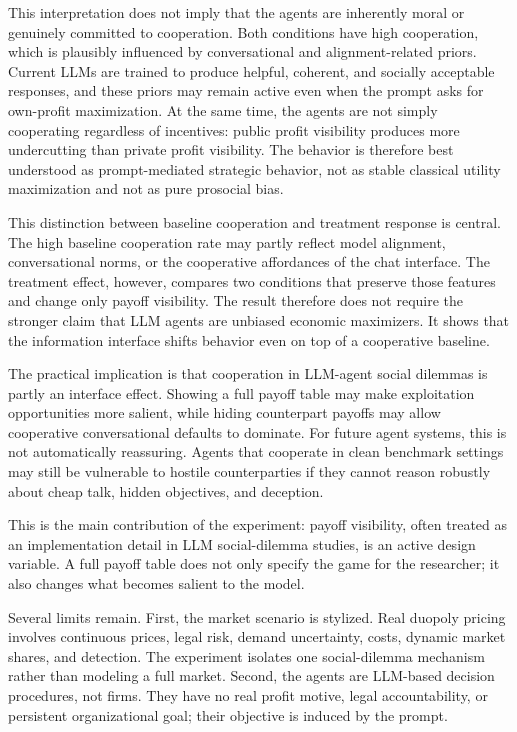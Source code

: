 \documentclass[11pt,a4paper]{article}
\makeatletter
\renewcommand\subsection{\@startsection{subsection}{2}{\z@}{9pt}{6pt}{\normalfont\fontsize{12pt}{14pt}\bfseries}}
\makeatother
\begin{document}
This interpretation does not imply that the agents are inherently moral or genuinely committed to cooperation. Both conditions have high cooperation, which is plausibly influenced by conversational and alignment-related priors. Current LLMs are trained to produce helpful, coherent, and socially acceptable responses, and these priors may remain active even when the prompt asks for own-profit maximization. At the same time, the agents are not simply cooperating regardless of incentives: public profit visibility produces more undercutting than private profit visibility. The behavior is therefore best understood as prompt-mediated strategic behavior, not as stable classical utility maximization and not as pure prosocial bias.

This distinction between baseline cooperation and treatment response is central. The high baseline cooperation rate may partly reflect model alignment, conversational norms, or the cooperative affordances of the chat interface. The treatment effect, however, compares two conditions that preserve those features and change only payoff visibility. The result therefore does not require the stronger claim that LLM agents are unbiased economic maximizers. It shows that the information interface shifts behavior even on top of a cooperative baseline.

The practical implication is that cooperation in LLM-agent social dilemmas is partly an interface effect. Showing a full payoff table may make exploitation opportunities more salient, while hiding counterpart payoffs may allow cooperative conversational defaults to dominate. For future agent systems, this is not automatically reassuring. Agents that cooperate in clean benchmark settings may still be vulnerable to hostile counterparties if they cannot reason robustly about cheap talk, hidden objectives, and deception.

This is the main contribution of the experiment: payoff visibility, often treated as an implementation detail in LLM social-dilemma studies, is an active design variable. A full payoff table does not only specify the game for the researcher; it also changes what becomes salient to the model.

\subsection{Limitations and Future Work}

Several limits remain. First, the market scenario is stylized. Real duopoly pricing involves continuous prices, legal risk, demand uncertainty, costs, dynamic market shares, and detection. The experiment isolates one social-dilemma mechanism rather than modeling a full market. Second, the agents are LLM-based decision procedures, not firms. They have no real profit motive, legal accountability, or persistent organizational goal; their objective is induced by the prompt.
\end{document}
